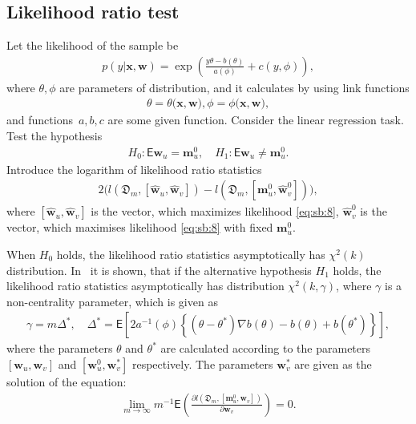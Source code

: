 \documentclass[
11pt,%
tightenlines,%
twoside,%
onecolumn,%
nofloats,%
nobibnotes,%
nofootinbib,%
superscriptaddress,%
noshowpacs,%
centertags]%
{revtex4}
\begin{document}
\subsection{Likelihood ratio test}\label{likelihood_test}
Let the likelihood of the sample be
\[
\label{eq:sb:8}
\begin{aligned}
	p(y|\mathbf{x},\textbf{w}) = \exp\left(\frac{y\theta- b(\theta)}{a(\phi)} + c\left(y, \phi\right)\right),
\end{aligned}
\]
where $\theta, \phi$ are parameters of distribution, and it calculates by using link functions 
\[
\label{eq:sb:8.1}
\begin{aligned}
\theta=\theta\bigr(\textbf{x},\textbf{w}\bigr), \phi=\phi\bigr(\textbf{x},\textbf{w}\bigr),
\end{aligned}
\] and functions~$a, b, c$ are some given function. Consider the linear regression task. Test the hypothesis
\[
\label{eq:sb:9}
\begin{aligned}
	H_0: \mathsf{E}\textbf{w}_{u} = \textbf{m}^0_{u}, \quad H_1: \mathsf{E}\textbf{w}_{u} \not= \textbf{m}^0_{u}.
\end{aligned}
\]
Introduce the logarithm of likelihood ratio statistics
\[
\label{eq:sb:10}
\begin{aligned}
	2\Big(l\left(\mathfrak{D}_m, [\hat{\textbf{w}}_{u},\hat{\textbf{w}}_{v}]\right) - l\left(\mathfrak{D}_m, [\textbf{m}^{0}_{u},\hat{\textbf{w}}^{0}_{v}]\right)\Big),
\end{aligned}
\]
where $[\hat{\textbf{w}}_{u},\hat{\textbf{w}}_{v}]$ is the vector, which maximizes likelihood \eqref{eq:sb:8}, $\hat{\textbf{w}}^{0}_{v}$ is the vector, which maximises likelihood \eqref{eq:sb:8} with fixed $\textbf{m}^{0}_{u}$.
	
When $H_0$ holds, the likelihood ratio statistics asymptotically has $\chi^2(k)$ distribution. In~\cite{shieh2000} it is shown, that if the alternative hypothesis $H_1$ holds, the likelihood ratio statistics asymptotically has distribution $\chi^2(k,\gamma)$, where $\gamma$ is a non-centrality parameter, which is given as
\[
\label{eq:sb:11}
\begin{aligned}
	\gamma = m\Delta^*, \quad \Delta^* = \mathsf{E}\left[2a^{-1}(\phi)\left\{\left(\theta - \theta^*\right)\nabla b(\theta) - b(\theta) + b(\theta^*)\right\}\right], 
\end{aligned}
\]
where the parameters $\theta$ and $\theta^*$ are calculated according to the parameters $[\textbf{w}_{u}, \textbf{w}_{v}]$ and $[\textbf{w}^{0}_{u}, \textbf{w}^{*}_{v}]$ respectively. The parameters  $\textbf{w}^{*}_{v}$ are given as the solution of the equation:
\[
\label{eq:sb:12}
\begin{aligned}
	\lim_{m\to\infty}m^{-1}\mathsf{E}\left(\frac{\partial l\left(\mathfrak{D}_m, \left[\textbf{m}^{0}_{u}, \textbf{w}_{v}\right]\right)}{\partial \textbf{w}_{v}}\right) = 0.
\end{aligned}
\]
	
\end{document}
